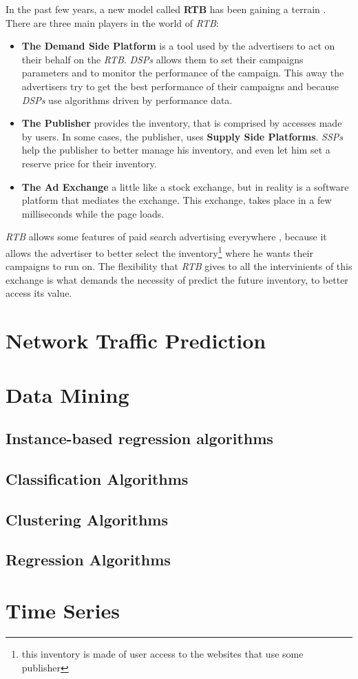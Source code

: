 In the past few years, a new model called \textbf{RTB} has been gaining a terrain \cite{Adfonic}. 
There are three main players in the world of \emph{RTB}:
\begin{itemize}
\item\textbf{The Demand Side Platform} is a tool used by the advertisers to act on their behalf on the \emph{RTB}. \emph{DSPs} allows them to set
their campaigns parameters and to monitor the performance of the campaign. This away the advertisers try to get the best performance of their campaigns and because 
\emph{DSPs} use algorithms driven by performance data.\cite{Gern201230}
\item\textbf{The Publisher} provides the inventory, that is comprised by accesses made by users. In some cases, the publisher, uses \textbf{Supply Side Platforms}.
\emph{SSPs} help the publisher to better manage his inventory, and even let him set a reserve price for their inventory.\cite{Yuan:2013:RBO:2501040.2501980}
\item\textbf{The Ad Exchange} a little like a stock exchange, but in reality is a software platform that mediates the exchange. This exchange, takes place in
a few milliseconds while the page loads.
\end{itemize}

\emph{RTB} allows some features of paid search advertising everywhere \cite{Gern201230}, because it allows the advertiser to better select
the inventory\footnote{this inventory is made of user access to the websites that use some publisher} where he wants their campaigns to run on.
The flexibility that \emph{RTB} gives to all the intervinients of this exchange is what demands the necessity of predict the future inventory, to
better access its value.


\section{Network Traffic Prediction}\label{sec:network}

\section{Data Mining}\label{sec:datamining}

\subsection{Instance-based regression algorithms}\label{sec:instance}

\subsection{Classification Algorithms}\label{sec:classification}

\subsection{Clustering Algorithms}\label{sec:clust}

\subsection{Regression Algorithms}\label{sec:regr}

\section{Time Series}\label{sec:timeseries}
